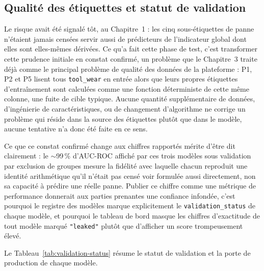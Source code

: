 \subsection{Qualité des étiquettes et statut de validation}
\label{sec:validation}

Le risque avait été signalé tôt, au Chapitre~1 : les cinq sous-étiquettes de panne n'étaient jamais censées servir aussi de prédicteurs de l'indicateur global dont elles sont elles-mêmes dérivées. Ce qu'a fait cette phase de test, c'est transformer cette prudence initiale en constat confirmé, un problème que le Chapitre~3 traite déjà comme le principal problème de qualité des données de la plateforme : P1, P2 et P5 lisent tous \texttt{tool\_wear} en entrée alors que leurs propres étiquettes d'entraînement sont calculées comme une fonction déterministe de cette même colonne, une fuite de cible typique. Aucune quantité supplémentaire de données, d'ingénierie de caractéristiques, ou de changement d'algorithme ne corrige un problème qui réside dans la source des étiquettes plutôt que dans le modèle, aucune tentative n'a donc été faite en ce sens.

Ce que ce constat confirmé change aux chiffres rapportés mérite d'être dit clairement : le $\sim$99\,\% d'AUC-ROC affiché par ces trois modèles sous validation par exclusion de groupes mesure la fidélité avec laquelle chacun reproduit une identité arithmétique qu'il n'était pas censé voir formulée aussi directement, non sa capacité à prédire une réelle panne. Publier ce chiffre comme une métrique de performance donnerait aux parties prenantes une confiance infondée, c'est pourquoi le registre des modèles marque explicitement le \texttt{validation\_status} de chaque modèle, et pourquoi le tableau de bord masque les chiffres d'exactitude de tout modèle marqué \texttt{"leaked"} plutôt que d'afficher un score trompeusement élevé.

Le Tableau~\ref{tab:validation-status} résume le statut de validation et la porte de production de chaque modèle.

